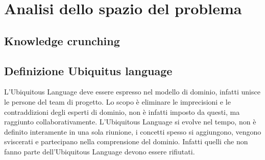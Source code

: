 \chapter{Analisi dello spazio del problema}
	\section{Knowledge crunching}	
	\section{Definizione Ubiquitus language}	
	L'Ubiquitous Language deve essere espresso nel modello di dominio, infatti  unisce le persone del team di progetto.
    Lo scopo è eliminare le imprecisioni e le contraddizioni degli esperti di dominio, non è infatti imposto da questi, ma raggiunto collaborativamente.
    L'Ubiquitous Language si evolve nel tempo, non è definito interamente in una sola riunione, i concetti spesso si aggiungono, vengono sviscerati e partecipano nella comprensione del dominio. Infatti quelli che non fanno parte dell'Ubiquitous Language devono essere rifiutati.





